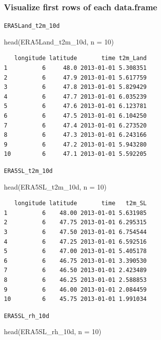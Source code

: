 \documentclass[
  letterpaper,
  DIV=11,
  numbers=noendperiod]{scrartcl}
\newenvironment{Shaded}{\begin{snugshade}}{\end{snugshade}}
\newcommand{\AttributeTok}[1]{\textcolor[rgb]{0.40,0.45,0.13}{#1}}
\newcommand{\DecValTok}[1]{\textcolor[rgb]{0.68,0.00,0.00}{#1}}
\newcommand{\FunctionTok}[1]{\textcolor[rgb]{0.28,0.35,0.67}{#1}}
\newcommand{\NormalTok}[1]{\textcolor[rgb]{0.00,0.23,0.31}{#1}}
\begin{document}
\subsubsection{Visualize first rows of each
data.frame}\label{visualize-first-rows-of-each-data.frame}

\texttt{ERA5Land\_t2m\_10d}

\begin{Shaded}
\begin{Highlighting}[]
\FunctionTok{head}\NormalTok{(ERA5Land\_t2m\_10d, }\AttributeTok{n =} \DecValTok{10}\NormalTok{)}
\end{Highlighting}
\end{Shaded}

\begin{verbatim}
   longitude latitude       time t2m_Land
1          6     48.0 2013-01-01 5.308351
2          6     47.9 2013-01-01 5.617759
3          6     47.8 2013-01-01 5.829429
4          6     47.7 2013-01-01 6.035239
5          6     47.6 2013-01-01 6.123781
6          6     47.5 2013-01-01 6.104250
7          6     47.4 2013-01-01 6.273520
8          6     47.3 2013-01-01 6.243166
9          6     47.2 2013-01-01 5.943280
10         6     47.1 2013-01-01 5.592205
\end{verbatim}

\texttt{ERA5SL\_t2m\_10d}

\begin{Shaded}
\begin{Highlighting}[]
\FunctionTok{head}\NormalTok{(ERA5SL\_t2m\_10d, }\AttributeTok{n =} \DecValTok{10}\NormalTok{)}
\end{Highlighting}
\end{Shaded}

\begin{verbatim}
   longitude latitude       time   t2m_SL
1          6    48.00 2013-01-01 5.631985
2          6    47.75 2013-01-01 6.295315
3          6    47.50 2013-01-01 6.754544
4          6    47.25 2013-01-01 6.592516
5          6    47.00 2013-01-01 5.405178
6          6    46.75 2013-01-01 3.390530
7          6    46.50 2013-01-01 2.423489
8          6    46.25 2013-01-01 2.588853
9          6    46.00 2013-01-01 2.084459
10         6    45.75 2013-01-01 1.991034
\end{verbatim}

\texttt{ERA5SL\_rh\_10d}

\begin{Shaded}
\begin{Highlighting}[]
\FunctionTok{head}\NormalTok{(ERA5SL\_rh\_10d, }\AttributeTok{n =} \DecValTok{10}\NormalTok{)}
\end{Highlighting}
\end{Shaded}
\end{document}

